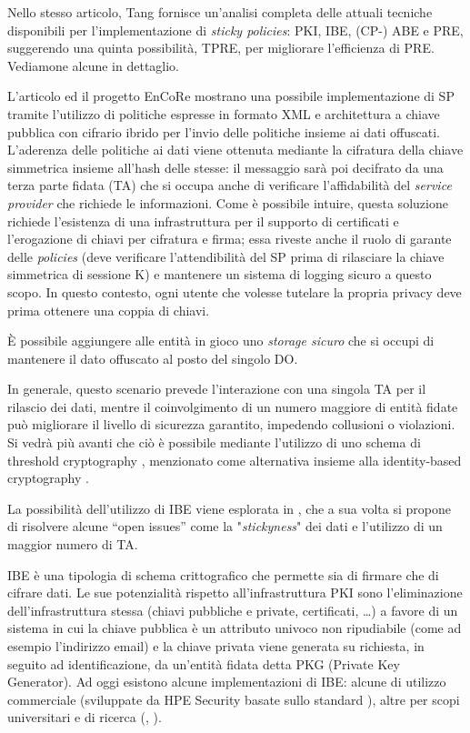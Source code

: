Nello stesso articolo, Tang fornisce un’analisi completa delle attuali tecniche disponibili per l’implementazione di \textit{sticky policies}: PKI, IBE, (CP-) ABE e PRE, suggerendo una quinta possibilit\`a, TPRE, per migliorare l’efficienza di PRE. Vediamone alcune in dettaglio.

L’articolo \cite{pearson2011sticky} ed il progetto EnCoRe mostrano una possibile implementazione di SP tramite l’utilizzo di politiche espresse in formato XML e architettura a chiave pubblica con cifrario ibrido per l’invio delle politiche insieme ai dati offuscati. L’aderenza delle politiche ai dati viene ottenuta mediante la cifratura della chiave simmetrica insieme all’hash delle stesse: il messaggio sar\`a poi decifrato da una terza parte fidata (TA) che si occupa anche di verificare l’affidabilit\`a del \textit{service provider} che richiede le informazioni. Come \`e possibile intuire, questa soluzione richiede l’esistenza di una infrastruttura per il supporto di certificati e l’erogazione di chiavi per cifratura e firma; essa riveste anche il ruolo di garante delle \textit{policies} (deve verificare l’attendibilit\`a del SP prima di rilasciare la chiave simmetrica di sessione K) e mantenere un sistema di logging sicuro a questo scopo. In questo contesto, ogni utente che volesse tutelare la propria privacy deve prima ottenere una coppia di chiavi. 

\`E possibile aggiungere alle entit\`a in gioco uno \textit{storage sicuro} che si occupi di mantenere il dato offuscato al posto del singolo DO.

In generale, questo scenario prevede l’interazione con una singola TA per il rilascio dei dati, mentre il coinvolgimento di un numero maggiore di entit\`a fidate può migliorare il livello di sicurezza garantito, impedendo collusioni o violazioni. Si vedr\`a pi\`u avanti che ci\`o \`e possibile mediante l’utilizzo di uno schema di threshold cryptography \cite{shamir1979share}, menzionato come alternativa insieme alla identity-based cryptography \cite{shamir1984identity}.

La possibilit\`a dell’utilizzo di IBE viene esplorata in \cite{mont2003towards}, che a sua volta si propone di risolvere alcune “open issues” come la "\textit{stickyness}" dei dati e l’utilizzo di un maggior numero di TA.

IBE \cite{shamir1984identity} \`e una tipologia di schema crittografico che permette sia di firmare che di cifrare dati. Le sue potenzialit\`a rispetto all’infrastruttura PKI sono l’eliminazione dell’infrastruttura stessa (chiavi pubbliche e private, certificati, …) a favore di un sistema in cui la chiave pubblica \`e un attributo univoco non ripudiabile (come ad esempio l’indirizzo email) e la chiave privata viene generata su richiesta, in seguito ad identificazione, da un’entit\`a fidata detta PKG (Private Key Generator).
Ad oggi esistono alcune implementazioni di IBE: alcune di utilizzo commerciale (sviluppate da HPE Security \cite{IBEimplVoltage} basate sullo standard \cite{boyen2007identity}), altre per scopi universitari e di ricerca (\cite{Lynn2013}, \cite{ducas2016}).

